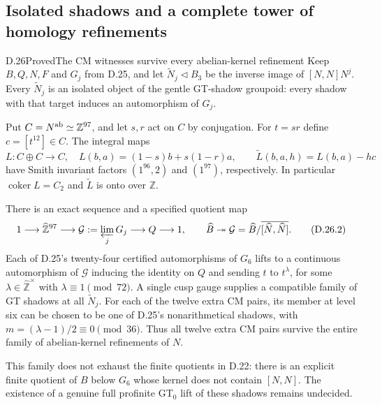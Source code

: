 \subsection{Isolated shadows and a complete tower of homology refinements}

\begin{statement}{D.26}{Proved}{The CM witnesses survive every abelian-kernel refinement}
Keep $B,Q,N,F$ and $G_j$ from D.25, and let
$\widetilde N_j\triangleleft B_3$ be the inverse image of
$[N,N]N^j$. Every $\widetilde N_j$ is an isolated object of
the gentle GT-shadow groupoid: every shadow with that target
induces an automorphism of $G_j$.

Put $C=N^{\rm ab}\simeq\mathbb Z^{97}$, and let $s,r$ act
on $C$ by conjugation. For $t=sr$ define $c=[t^{12}]\in C$.
The integral maps
\[
 L:C\oplus C\longrightarrow C,\quad
 L(b,a)=(1-s)b+s(1-r)a,\qquad
 \widetilde L(b,a,h)=L(b,a)-hc                         \tag{D.26.1}
\]
have Smith invariant factors $(1^{96},2)$ and $(1^{97})$,
respectively. In particular $\operatorname{coker}L=C_2$
and $\widetilde L$ is onto over $\mathbb Z$.

There is an exact sequence and a specified quotient map
\[
 1\longrightarrow\widehat{\mathbb Z}^{97}
 \longrightarrow\mathcal G:=\varprojlim_j G_j
 \longrightarrow Q\longrightarrow1,\qquad
 \widehat B\twoheadrightarrow\mathcal G
   =\widehat B/\overline{[\widehat N,\widehat N]} .       \tag{D.26.2}
\]
Each of D.25's twenty-four certified automorphisms of $G_6$
lifts to a continuous automorphism of $\mathcal G$ inducing
the identity on $Q$ and sending $t$ to $t^\lambda$, for some
$\lambda\in\widehat{\mathbb Z}^{\times}$ with
$\lambda\equiv1\pmod{72}$. A single cusp gauge supplies a
compatible family of GT shadows at all $\widetilde N_j$.
For each of the twelve extra CM pairs, its member at level six
can be chosen to be one of D.25's nonarithmetical shadows,
with $m=(\lambda-1)/2\equiv0\pmod{36}$.
Thus all twelve extra CM pairs survive the entire family of
abelian-kernel refinements of $N$.

This family does not exhaust the finite quotients in D.22:
there is an explicit finite quotient of $B$ below $G_6$ whose
kernel does not contain $[N,N]$. The existence of a genuine
full profinite GT$_0$ lift of these shadows remains undecided.
\end{statement}
